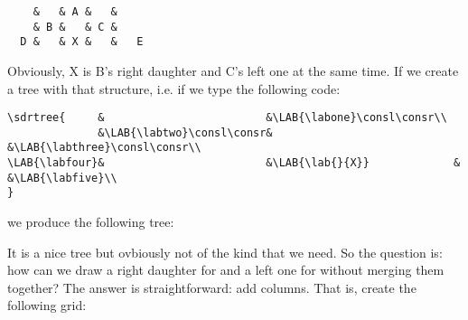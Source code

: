 \documentclass[a4paper]{article}
\begin{document}
\large
\begin{verbatim}
    &   & A &   &
    & B &   & C &
  D &   & X &   &	E
\end{verbatim}
\normalsize
Obviously, X is B's right daughter and C's left one at the same time. If we create a tree with that structure, i.e. if we type the following code:
\footnotesize
\begin{verbatim}
\sdrtree{     &                         &\LAB{\labone}\consl\consr\\
              &\LAB{\labtwo}\consl\consr&                            &\LAB{\labthree}\consl\consr\\
\LAB{\labfour}&                         &\LAB{\lab{}{X}}             &                             &\LAB{\labfive}\\
}
\end{verbatim}
\normalsize
we produce the following tree:
\begin{center}
\end{center}
It is a nice tree but ovbiously not of the kind that we need. So the question is: how can we draw a right daughter for  and a left one for  without merging them together? The answer is straightforward: add columns. That is, create the following grid:
\end{document}
